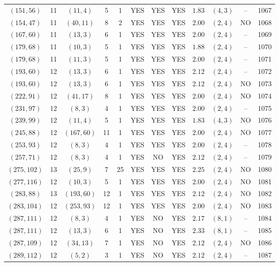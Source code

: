 \begin{longtable}{|c|c|c|c|c|c|c|c|c|c|c|c|}
$(151,56)$ & 11 & $(11,4)$ & 5 & 1 & YES & YES & YES & $1.83$ & $(4,3)$ & -- & 1067\\
$(154,47)$ & 11 & $(40,11)$ & 8 & 2 & YES & YES & YES & $2.00$ & $(2,4)$ & NO & 1068\\
$(167,60)$ & 11 & $(13,3)$ & 6 & 1 & YES & YES & YES & $2.00$ & $(2,4)$ & -- & 1069\\
$(179,68)$ & 11 & $(10,3)$ & 5 & 1 & YES & YES & YES & $1.88$ & $(2,4)$ & -- & 1070\\
$(179,68)$ & 11 & $(11,3)$ & 5 & 1 & YES & YES & YES & $2.00$ & $(2,4)$ & -- & 1071\\
$(193,60)$ & 12 & $(13,3)$ & 6 & 1 & YES & YES & YES & $2.12$ & $(2,4)$ & -- & 1072\\
$(193,60)$ & 12 & $(13,3)$ & 6 & 1 & YES & YES & YES & $2.12$ & $(2,4)$ & NO & 1073\\
$(222,91)$ & 12 & $(41,17)$ & 8 & 1 & YES & YES & YES & $2.00$ & $(2,4)$ & NO & 1074\\
$(231,97)$ & 12 & $(8,3)$ & 4 & 1 & YES & YES & YES & $2.00$ & $(2,4)$ & -- & 1075\\
$(239,99)$ & 12 & $(11,4)$ & 5 & 1 & YES & YES & YES & $1.83$ & $(4,3)$ & NO & 1076\\
$(245,88)$ & 12 & $(167,60)$ & 11 & 1 & YES & YES & YES & $2.00$ & $(2,4)$ & NO & 1077\\
$(253,93)$ & 12 & $(8,3)$ & 4 & 1 & YES & YES & YES & $2.00$ & $(2,4)$ & -- & 1078\\
$(257,71)$ & 12 & $(8,3)$ & 4 & 1 & YES & NO & YES & $2.12$ & $(2,4)$ & -- & 1079\\
$(275,102)$ & 13 & $(25,9)$ & 7 & 25 & YES & YES & YES & $2.25$ & $(2,4)$ & NO & 1080\\
$(277,116)$ & 12 & $(10,3)$ & 5 & 1 & YES & YES & YES & $2.00$ & $(2,4)$ & NO & 1081\\
$(283,88)$ & 13 & $(193,60)$ & 12 & 1 & YES & YES & YES & $2.12$ & $(2,4)$ & NO & 1082\\
$(283,104)$ & 12 & $(253,93)$ & 12 & 1 & YES & YES & YES & $2.00$ & $(2,4)$ & NO & 1083\\
$(287,111)$ & 12 & $(8,3)$ & 4 & 1 & YES & NO & YES & $2.17$ & $(8,1)$ & -- & 1084\\
$(287,111)$ & 12 & $(13,3)$ & 6 & 1 & YES & NO & YES & $2.33$ & $(8,1)$ & -- & 1085\\
$(287,109)$ & 12 & $(34,13)$ & 7 & 1 & YES & NO & YES & $2.12$ & $(2,4)$ & NO & 1086\\
$(289,112)$ & 12 & $(5,2)$ & 3 & 1 & YES & NO & YES & $2.12$ & $(2,4)$ & -- & 1087\\

\end{longtable}
